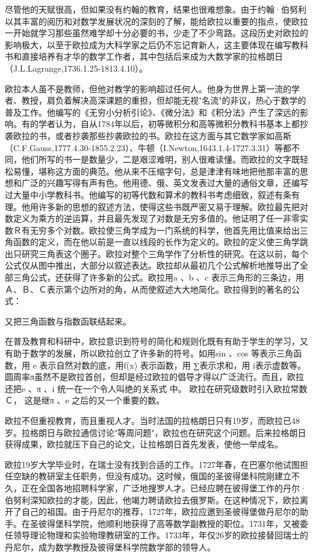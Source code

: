 \documentclass[UTF8]{ctexart}
\begin{document}
尽管他的天赋很高，但如果没有约翰的教育，结果也很难想象。由于约翰·伯努利以其丰富的阅历和对数学发展状况的深刻的了解，能给欧拉以重要的指点，使欧拉一开始就学习那些虽然难学却十分必要的书，少走了不少弯路。这段历史对欧拉的影响极大，以至于欧拉成为大科学家之后仍不忘记育新人，这主要体现在编写教科书和直接培养有才华的数学工作者，其中包括后来成为大数学家的拉格朗日（J.L.Lagrange,1736.1.25-1813.4.10）。

欧拉本人虽不是教师，但他对教学的影响超过任何人。他身为世界上第一流的学者、教授，肩负着解决高深课题的重担，但却能无视"名流"的非议，热心于数学的普及工作。他编写的《无穷小分析引论》、《微分法》和《积分法》产生了深远的影响。有的学者认为，自从1784年以后，初等微积分和高等微积分教科书基本上都抄袭欧拉的书，或者抄袭那些抄袭欧拉的书。欧拉在这方面与其它数学家如高斯（C.F.Gauss,1777.4.30-1855.2.23）、牛顿（I.Newton,1643.1.4-1727.3.31）等都不同，他们所写的书一是数量少，二是艰涩难明，别人很难读懂。而欧拉的文字既轻松易懂，堪称这方面的典范。他从来不压缩字句，总是津津有味地把他那丰富的思想和广泛的兴趣写得有声有色。他用德、俄、英文发表过大量的通俗文章，还编写过大量中小学教科书。他编写的初等代数和算术的教科书考虑细致，叙述有条有理。他用许多新的思想的叙述方法，使得这些书既严密又易于理解。欧拉最先把对数定义为乘方的逆运算，并且最先发现了对数是无穷多值的。他证明了任一非零实数Ｒ有无穷多个对数。欧拉使三角学成为一门系统的科学，他首先用比值来给出三角函数的定义，而在他以前是一直以线段的长作为定义的。欧拉的定义使三角学跳出只研究三角表这个圈子。欧拉对整个三角学作了分析性的研究。在这以前，每个公式仅从图中推出，大部分以叙述表达。欧拉却从最初几个公式解析地推导出了全部三角公式，还获得了许多新的公式。欧拉用a 、b 、c 表示三角形的三条边，用Ａ、Ｂ、Ｃ表示第个边所对的角，从而使叙述大大地简化。欧拉得到的著名的公式：

又把三角函数与指数函联结起来。

在普及教育和科研中，欧拉意识到符号的简化和规则化既有有助于学生的学习，又有助于数学的发展，所以欧拉创立了许多新的符号。如用sin 、cos 等表示三角函数，用 e 表示自然对数的底，用f(x) 表示函数，用 ∑表示求和，用 i表示虚数等。圆周率π虽然不是欧拉首创，但却是经过欧拉的倡导才得以广泛流行。而且，欧拉还把e 、π 、i 统一在一个令人叫绝的关系式 中。 欧拉在研究级数时引入欧拉常数Ｃ， 这是继π 、e 之后的又一个重要的数。

欧拉不但重视教育，而且重视人才。当时法国的拉格朗日只有19岁，而欧拉已48岁。拉格朗日与欧拉通信讨论"等周问题"，欧拉也在研究这个问题。后来拉格朗日获得成果，欧拉就压下自己的论文，让拉格朗日首先发表，使他一举成名。

欧拉19岁大学毕业时，在瑞士没有找到合适的工作。1727年春，在巴塞尔他试图担任空缺的教研室主任职务，但没有成功。这时候，俄国的圣彼得堡科院刚建立不久，正在全国各地招聘科学家，广泛地搜罗人才。已经应聘在彼得堡工作的丹尔·伯努利深知欧拉的才能，因此，他竭力聘请欧拉去俄罗斯。在这种情况下，欧拉离开了自己的祖国。由于丹尼尔的推荐，1727年，欧拉应邀到圣彼得堡做丹尼尔的助手。在圣彼得堡科学院，他顺利地获得了高等数学副教授的职位。1731年，又被委任领导理论物理和实验物理教研室的工作。1733年，年仅26岁的欧拉接替回瑞士的丹尼尔，成为数学教授及彼得堡科学院数学部的领导人。
\end{document}
